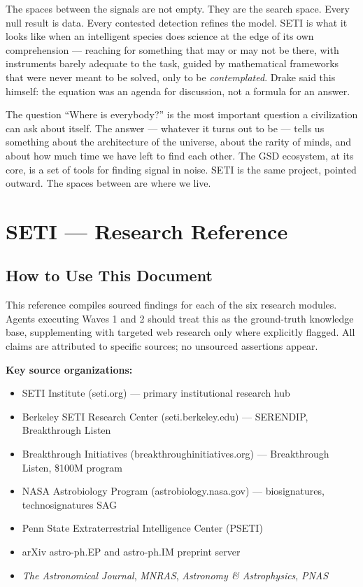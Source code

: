 \documentclass[11pt,letterpaper]{article}
\newcommand{\stageheader}[2]{%
  \noindent\colorbox{#2}{\makebox[\textwidth][l]{%
    \textcolor{white}{\bfseries\sffamily\hspace{6pt}#1\hspace{6pt}}}}%
  \vspace{0.5em}\par%
}
\begin{document}
The spaces between the signals are not empty. They are the search space. Every null result is data. Every contested detection refines the model. SETI is what it looks like when an intelligent species does science at the edge of its own comprehension --- reaching for something that may or may not be there, with instruments barely adequate to the task, guided by mathematical frameworks that were never meant to be solved, only to be \textit{contemplated}. Drake said this himself: the equation was an agenda for discussion, not a formula for an answer.

The question ``Where is everybody?'' is the most important question a civilization can ask about itself. The answer --- whatever it turns out to be --- tells us something about the architecture of the universe, about the rarity of minds, and about how much time we have left to find each other. The GSD ecosystem, at its core, is a set of tools for finding signal in noise. SETI is the same project, pointed outward. The spaces between are where we live.

\newpage
\stageheader{STAGE 2 --- RESEARCH REFERENCE}{secondary}

\section{SETI --- Research Reference}

\subsection{How to Use This Document}

This reference compiles sourced findings for each of the six research modules. Agents executing Waves 1 and 2 should treat this as the ground-truth knowledge base, supplementing with targeted web research only where explicitly flagged. All claims are attributed to specific sources; no unsourced assertions appear.

\textbf{Key source organizations:}
\begin{itemize}[leftmargin=1.5em]
  \item SETI Institute (seti.org) --- primary institutional research hub
  \item Berkeley SETI Research Center (seti.berkeley.edu) --- SERENDIP, Breakthrough Listen
  \item Breakthrough Initiatives (breakthroughinitiatives.org) --- Breakthrough Listen, \$100M program
  \item NASA Astrobiology Program (astrobiology.nasa.gov) --- biosignatures, technosignatures SAG
  \item Penn State Extraterrestrial Intelligence Center (PSETI)
  \item arXiv astro-ph.EP and astro-ph.IM preprint server
  \item \textit{The Astronomical Journal}, \textit{MNRAS}, \textit{Astronomy \& Astrophysics}, \textit{PNAS}
\end{itemize}
\end{document}
